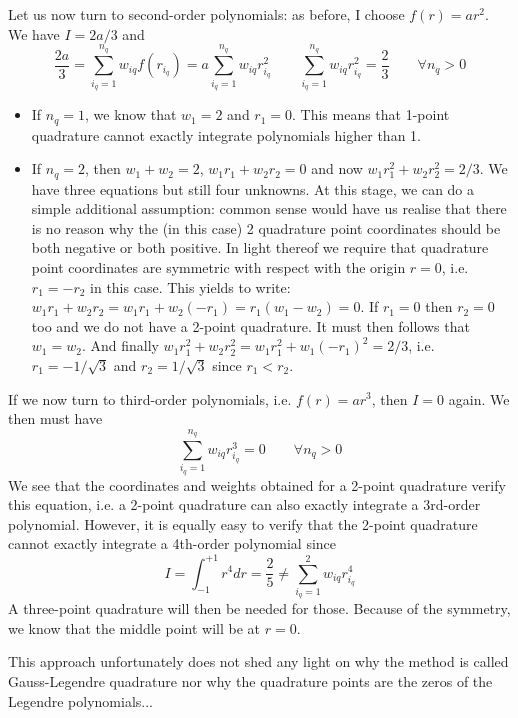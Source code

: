 Let us now turn to second-order polynomials: as before, I choose $f(r)=a r^2$. We have 
$I=2a/3$ and 
\begin{equation}
\frac{2a}{3} = \sum_{i_q=1}^{n_q} w_{iq} f(r_{i_q})  = a \sum_{i_q=1}^{n_q} w_{iq} r_{i_q}^2 
\qquad
\boxed{
\sum_{i_q=1}^{n_q} w_{iq} r^2_{i_q} = \frac{2}{3}\qquad \forall n_q>0
}
\label{eq:glqthree}
\end{equation}
\begin{itemize}
\item
If $n_q=1$, we know that $w_1=2$ and $r_1=0$. 
This means that 1-point quadrature cannot exactly integrate polynomials higher than 1.
\item
If $n_q=2$, then $w_1+w_2=2$, $w_1r_1+w_2r_2 =0$ and now $w_1r_1^2+w_2r_2^2 =2/3$. We have three equations but still four unknowns. 
At this stage, we can do a simple additional assumption: common sense would have us realise that there is no 
reason why the (in this case) 2 quadrature point coordinates should be both negative or both positive. In light 
thereof we require that quadrature point coordinates are symmetric with respect with the origin $r=0$, i.e. $r_1=-r_2$ in this case.
This yields to write:  $w_1r_1+w_2r_2 = w_1r_1+w_2(-r_1)=r_1(w_1-w_2)=0$. If $r_1=0$ then $r_2=0$ too and we do not 
have a 2-point quadrature. It must then follows that $w_1=w_2$. And finally 
$w_1r_1^2+w_2r_2^2 = w_1 r_1^2 + w_1 (-r_1)^2=2/3$, i.e. $r_1=-1/\sqrt{3}$ and $r_2=1/\sqrt{3}$ since $r_1<r_2$.
\end{itemize}

If we now turn to third-order polynomials, i.e. $f(r)=ar^3$, then $I=0$ again. We then must have
\begin{equation}
\boxed{
\sum_{i_q=1}^{n_q} w_{iq} r^3_{i_q} =  0  \qquad \forall n_q>0
}
\end{equation}
We see that the coordinates and weights obtained for a 2-point quadrature verify this equation, i.e. 
a 2-point quadrature can also exactly integrate a 3rd-order polynomial.
However, it is equally easy to verify that the 2-point quadrature cannot exactly integrate a 4th-order polynomial
since 
\[
I= \int_{-1}^{+1} r^4 dr = \frac{2}{5} \neq  \sum_{i_q=1}^{2} w_{iq} r_{i_q}^4
\]
A three-point quadrature will then be needed for those. Because of the symmetry, we know that the middle
point will be at $r=0$.

\begin{remark} 
This approach unfortunately does not shed any light on why the method is called Gauss-Legendre quadrature
nor why the quadrature points are the zeros of the Legendre polynomials...
\end{remark}


